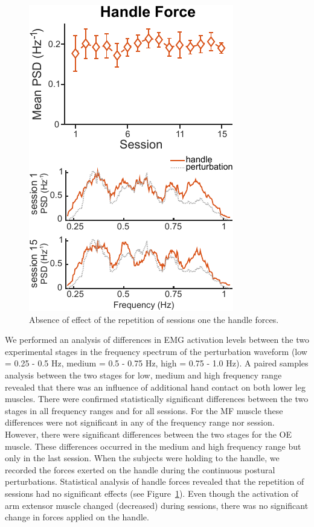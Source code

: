 \documentclass[final,5p,twocolumn]{elsarticle}
\begin{document}
\begin{figure}
	\begin{center}
		\includegraphics[width=0.7\linewidth]{images/HandleForce-all-1.pdf}
		\caption{Absence of effect of the repetition of sessions one the handle forces.}
		\label{fig:HandleForces}
	\end{center}
\end{figure}

We performed an analysis of differences in EMG activation levels between the two experimental stages in the frequency spectrum of the perturbation waveform (low = 0.25 - 0.5 Hz, medium = 0.5 - 0.75 Hz, high = 0.75 - 1.0 Hz). A paired samples analysis between the two stages for low, medium and high frequency range revealed that there was an influence of additional hand contact on both lower leg muscles. There were confirmed statistically significant differences between the two stages in all frequency ranges and for all sessions. For the MF muscle these differences were not significant in any of the frequency range nor session. However, there were significant differences between the two stages for the OE muscle. These differences occurred in the medium and high frequency range but only in the last session. When the subjects were holding to the handle, we recorded the forces exerted on the handle during the continuous postural perturbations. Statistical analysis of handle forces revealed that the repetition of sessions had no significant effects (see Figure~\ref{fig:HandleForces}). Even though the activation of arm extensor muscle changed (decreased) during sessions, there was no significant change in forces applied on the handle.\\
\end{document}
